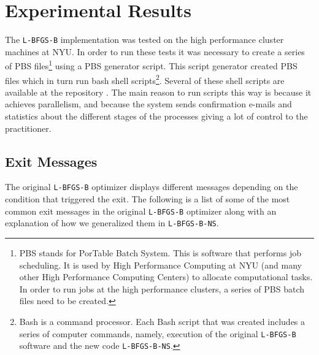 \chapter{Experimental Results}

The \texttt{L-BFGS-B} implementation was tested on the high performance cluster machines at NYU. In order to run these tests it was necessary to create a series of PBS files\footnote{PBS stands for PorTable Batch System. This is software that performs job scheduling. It is used by High Performance Computing at NYU (and many other High Performance Computing Centers) to allocate computational tasks. In order to run jobs at the high performance clusters, a series of PBS batch files need to be created.} using a PBS generator script. This script generator created PBS files which in turn run bash shell scripts\footnote{Bash is a command processor. Each Bash script that was created includes a series of computer commands, namely, execution of the original \texttt{L-BFGS-B} software and the new code \texttt{L-BFGS-B-NS}.}. Several of these shell scripts are available at the repository \citep{lbfgsbNS}. The main reason to run scripts this way is because it achieves parallelism, and because the system sends confirmation e-mails and statistics about the different stages of the processes giving a lot of control to the practitioner.

\section{Exit Messages}

The original \texttt{L-BFGS-B} optimizer displays different messages depending on the condition that triggered the exit. The following is a list of some of the most common exit messages in the original \texttt{L-BFGS-B} optimizer along with an explanation of how we generalized them in \texttt{L-BFGS-B-NS}.

